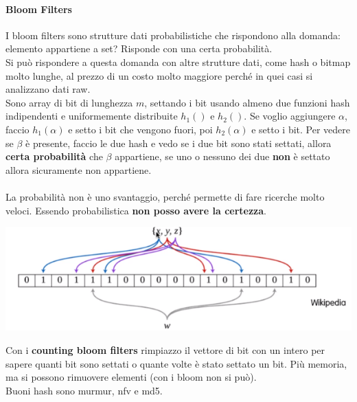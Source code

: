 \documentclass[10pt]{book}
\begin{document}
\paragraph{Bloom Filters} I bloom filters sono strutture dati probabilistiche che rispondono alla domanda: elemento appartiene a set? Risponde con una certa probabilità.\\
Si può rispondere a questa domanda con altre strutture dati, come hash o bitmap molto lunghe, al prezzo di un costo molto maggiore perché in quei casi si analizzano dati raw.\\
Sono array di bit di lunghezza $m$, settando i bit usando almeno due funzioni hash indipendenti e uniformemente distribuite $h_1()$ e $h_2()$. Se voglio aggiungere $\alpha$, faccio $h_1(\alpha)$ e setto i bit che vengono fuori, poi $h_2(\alpha)$ e setto i bit. Per vedere se $\beta$ è presente, faccio le due hash e vedo se i due bit sono stati settati, allora \textbf{certa probabilità} che $\beta$ appartiene, se uno o nessuno dei due \textbf{non} è settato allora sicuramente non appartiene.\\\\
La probabilità non è uno svantaggio, perché permette di fare ricerche molto veloci. Essendo probabilistica \textbf{non posso avere la certezza}.
\begin{center}
	\includegraphics[scale=0.85]{bloomfilters.png}
\end{center}
Con i \textbf{counting bloom filters} rimpiazzo il vettore di bit con un intero per sapere quanti bit sono settati o quante volte è stato settato un bit. Più memoria, ma si possono rimuovere elementi (con i bloom non si può).\\
Buoni hash sono murmur, nfv e md5.
\end{document}

